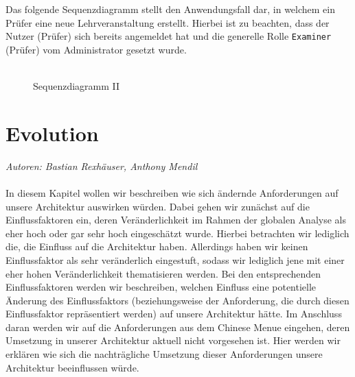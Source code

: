 \documentclass[enabledeprecatedfontcommands,fontsize=11pt,paper=a4,twoside]{scrartcl}
\begin{document}
Das folgende Sequenzdiagramm stellt den Anwendungsfall dar, in welchem ein Prüfer eine neue Lehrveranstaltung erstellt. Hierbei ist zu beachten, dass der Nutzer (Prüfer) sich bereits angemeldet hat und die generelle Rolle \texttt{Examiner} (Prüfer) vom Administrator gesetzt wurde.\\ \\
\begin{figure}[ht]
	\centering
	\caption{Sequenzdiagramm II}
\end{figure}

\newpage
\section{Evolution}
\label{sec:evolution}
\emph{Autoren: Bastian Rexhäuser, Anthony Mendil}\\\\
In diesem Kapitel wollen wir beschreiben wie sich ändernde Anforderungen auf unsere Architektur auswirken würden. Dabei gehen wir zunächst auf die Einflussfaktoren ein, deren Veränderlichkeit im Rahmen der globalen Analyse als eher hoch oder gar sehr hoch eingeschätzt wurde. Hierbei betrachten wir lediglich die, die Einfluss auf die Architektur haben. Allerdings haben wir keinen Einflussfaktor als sehr veränderlich eingestuft, sodass wir lediglich jene mit einer eher hohen Veränderlichkeit thematisieren werden. Bei den entsprechenden Einflussfaktoren werden wir beschreiben, welchen Einfluss eine potentielle Änderung des Einflussfaktors (beziehungsweise der Anforderung, die durch diesen Einflussfaktor repräsentiert werden) auf unsere Architektur hätte. Im Anschluss daran werden wir auf die Anforderungen aus dem Chinese Menue eingehen, deren Umsetzung in unserer Architektur aktuell nicht vorgesehen ist. Hier werden wir erklären wie sich die nachträgliche Umsetzung dieser Anforderungen unsere Architektur beeinflussen würde. \\ 
 
\end{document}
